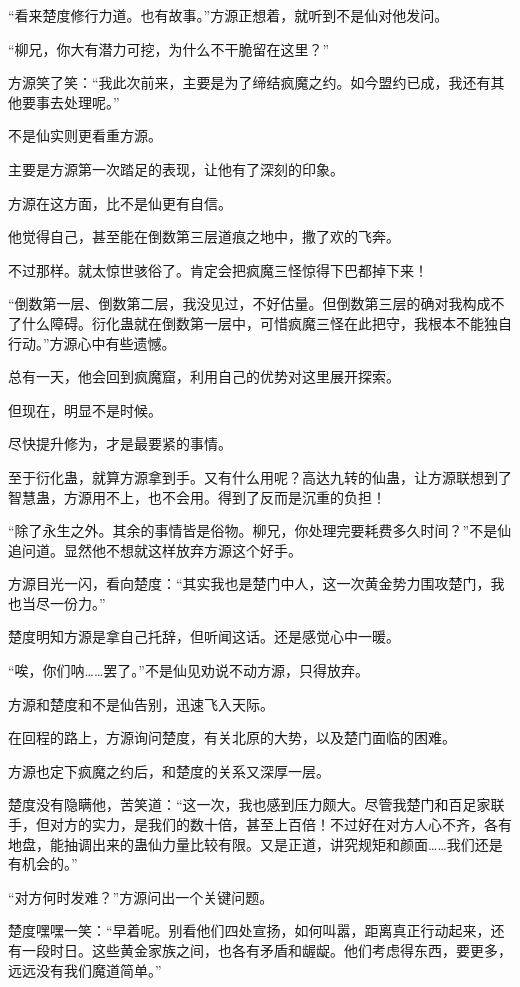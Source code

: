 \begin{this_body}
“看来楚度修行力道。也有故事。”方源正想着，就听到不是仙对他发问。

“柳兄，你大有潜力可挖，为什么不干脆留在这里？”

方源笑了笑：“我此次前来，主要是为了缔结疯魔之约。如今盟约已成，我还有其他要事去处理呢。”

不是仙实则更看重方源。

主要是方源第一次踏足的表现，让他有了深刻的印象。

方源在这方面，比不是仙更有自信。

他觉得自己，甚至能在倒数第三层道痕之地中，撒了欢的飞奔。

不过那样。就太惊世骇俗了。肯定会把疯魔三怪惊得下巴都掉下来！

“倒数第一层、倒数第二层，我没见过，不好估量。但倒数第三层的确对我构成不了什么障碍。衍化蛊就在倒数第一层中，可惜疯魔三怪在此把守，我根本不能独自行动。”方源心中有些遗憾。

总有一天，他会回到疯魔窟，利用自己的优势对这里展开探索。

但现在，明显不是时候。

尽快提升修为，才是最要紧的事情。

至于衍化蛊，就算方源拿到手。又有什么用呢？高达九转的仙蛊，让方源联想到了智慧蛊，方源用不上，也不会用。得到了反而是沉重的负担！

“除了永生之外。其余的事情皆是俗物。柳兄，你处理完要耗费多久时间？”不是仙追问道。显然他不想就这样放弃方源这个好手。

方源目光一闪，看向楚度：“其实我也是楚门中人，这一次黄金势力围攻楚门，我也当尽一份力。”

楚度明知方源是拿自己托辞，但听闻这话。还是感觉心中一暖。

“唉，你们呐……罢了。”不是仙见劝说不动方源，只得放弃。

方源和楚度和不是仙告别，迅速飞入天际。

在回程的路上，方源询问楚度，有关北原的大势，以及楚门面临的困难。

方源也定下疯魔之约后，和楚度的关系又深厚一层。

楚度没有隐瞒他，苦笑道：“这一次，我也感到压力颇大。尽管我楚门和百足家联手，但对方的实力，是我们的数十倍，甚至上百倍！不过好在对方人心不齐，各有地盘，能抽调出来的蛊仙力量比较有限。又是正道，讲究规矩和颜面……我们还是有机会的。”

“对方何时发难？”方源问出一个关键问题。

楚度嘿嘿一笑：“早着呢。别看他们四处宣扬，如何叫嚣，距离真正行动起来，还有一段时日。这些黄金家族之间，也各有矛盾和龌龊。他们考虑得东西，要更多，远远没有我们魔道简单。”


\end{this_body}
